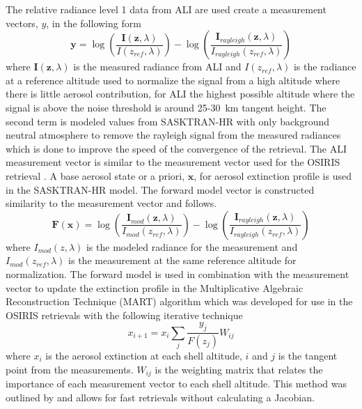 The relative radiance level 1 data from ALI are used create a measurement vectors, $y$, in the following form
\begin{equation}
    \mathbf{y} = \log\left(\frac{\mathbf{I}(\mathbf{z},\lambda)}{I(z_{ref},\lambda)}\right)-\log\left(\frac{\mathbf{I}_{rayleigh}(\mathbf{z},\lambda)}{I_{rayleigh}(z_{ref},\lambda)}\right)
    \label{eqn:measurementVector}
\end{equation}
where $\mathbf{I}(\mathbf{z},\lambda)$ is the measured radiance from ALI and $I(z_{ref},\lambda)$ is the radiance at a reference altitude used to normalize the signal from a high altitude where there is little aerosol contribution, for ALI the highest possible altitude where the signal is above the noise threshold is around 25-30~km tangent height. The second term is modeled values from SASKTRAN-HR with only background neutral atmosphere to remove the rayleigh signal from the measured radiances which is done to improve the speed of the convergence of the retrieval. The ALI measurement vector is similar to the measurement vector used for the OSIRIS retrieval \citep{Bourassa2007,Bourassa2011}. A base aerosol state or a priori, $\mathbf{x}$, for aerosol extinction profile is used in the SASKTRAN-HR model. The forward model vector is constructed similarity to the measurement vector and follows.
\begin{equation}
    \mathbf{F}(\mathbf{x}) = \log\left(\frac{\mathbf{I}_{mod}(\mathbf{z},\lambda)}{I_{mod}(z_{ref},\lambda)}\right)-\log\left(\frac{\mathbf{I}_{rayleigh}(\mathbf{z},\lambda)}{I_{rayleigh}(z_{ref},\lambda)}\right)
    \label{eqn:forwardModel}
\end{equation}
where $I_{mod}(z,\lambda)$ is the modeled radiance for the measurement and $I_{mod}(z_{ref},\lambda)$ is the measurement at the same reference altitude for normalization. The forward model is used in combination with the measurement vector to update the extinction profile in the Multiplicative Algebraic Reconstruction Technique (MART) algorithm which was developed for use in the OSIRIS retrievals \citep{Bourassa2012a} with the following iterative technique
\begin{equation}
    x_{i+1} = x_{i}\sum_{j}\frac{y_{j}}{F(z_{j})}W_{ij}
\end{equation}
where $x_{i}$ is the aerosol extinction at each shell altitude, $i$ and $j$ is the tangent point from the measurements. $W_{ij}$ is the weighting matrix that relates the importance of each measurement vector to each shell altitude. This method was outlined by \cite{Degenstein2009} and allows for fast retrievals without calculating a Jacobian.

